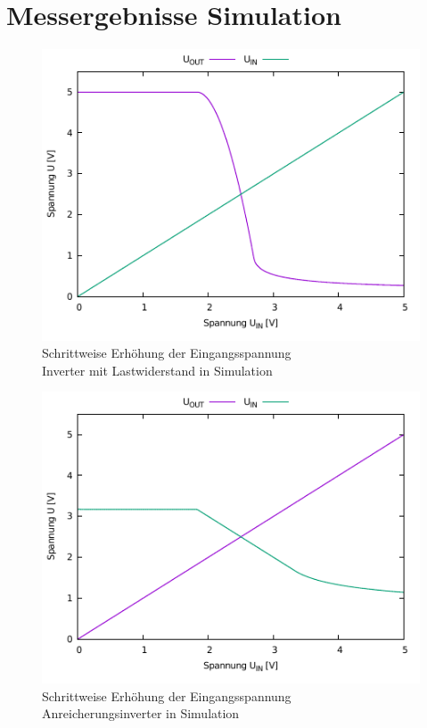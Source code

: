 \documentclass[11pt, a4paper]{article}
\begin{document}
\section*{Messergebnisse Simulation}
\begin{figure}
    \centering
    \includegraphics[width=\linewidth]{simLast.pdf}
    \caption{Schrittweise Erhöhung der Eingangsspannung \\ Inverter mit Lastwiderstand in Simulation}
    \label{simLast}
\end{figure}
\begin{figure}
    \centering
    \includegraphics[width=\linewidth]{simAnreicherung.pdf}
    \caption{Schrittweise Erhöhung der Eingangsspannung \\ Anreicherungsinverter in Simulation}
    \label{simAnreicherung}
\end{figure}
\end{document}
